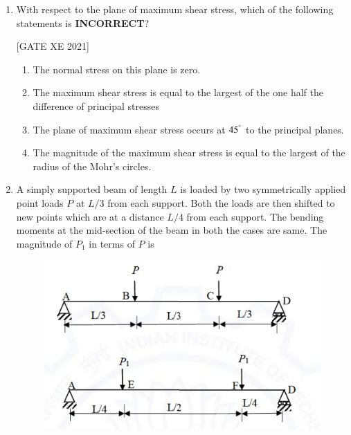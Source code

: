 \documentclass[journal,12pt,onecolumn]{IEEEtran}
\theoremstyle{remark}
\begin{document}
\begin{enumerate}[resume]
\hfill[GATE XE 2021]

\begin{multicols}{2}
\begin{enumerate}
\item 1
\item 2/5
\item 1/3
\item 3/5
\end{enumerate}
\end{multicols}

\item With respect to the plane of maximum shear stress, which of the following statements is \textbf{INCORRECT}?

\hfill[GATE XE 2021]

\begin{multicols}{2}
\begin{enumerate}
\item The normal stress on this plane is zero.
\item The maximum shear stress is equal to the largest of the one half the difference of principal stresses
\item The plane of maximum shear stress occurs at $45^\degree$ to the principal planes.
\item The magnitude of the maximum shear stress is equal to the largest of the radius of the Mohr’s circles.
\end{enumerate}
\end{multicols}

\item A simply supported beam of length $L$ is loaded by two symmetrically applied point loads $P$ at $L/3$ from each support. Both the loads are then shifted to new points which are at a distance $L/4$ from each support. The bending moments at the mid-section of the beam in both the cases are same. The magnitude of $P_1$ in terms of $P$ is

\begin{figure}[H]
      \centering
      \includegraphics[width=0.5\columnwidth]{figs/fig20.png}
      \caption{}
      \label{fig:placeholder}
  \end{figure}


\end{enumerate}
\end{document}
